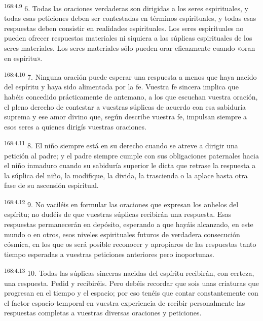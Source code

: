 \par 
\textsuperscript{168:4.9} 6. Todas las oraciones verdaderas son dirigidas a los seres espirituales, y todas esas peticiones deben ser contestadas en términos espirituales, y todas esas respuestas deben consistir en realidades espirituales. Los seres espirituales no pueden ofrecer respuestas materiales ni siquiera a las súplicas espirituales de los seres materiales. Los seres materiales sólo pueden orar eficazmente cuando «oran en espíritu».

\par 
\textsuperscript{168:4.10} 7. Ninguna oración puede esperar una respuesta a menos que haya nacido del espíritu y haya sido alimentada por la fe. Vuestra fe sincera implica que habéis concedido prácticamente de antemano, a los que escuchan vuestra oración, el pleno derecho de contestar a vuestras súplicas de acuerdo con esa sabiduría suprema y ese amor divino que, según describe vuestra fe, impulsan siempre a esos seres a quienes dirigís vuestras oraciones.

\par 
\textsuperscript{168:4.11} 8. El niño siempre está en su derecho cuando se atreve a dirigir una petición al padre; y el padre siempre cumple con sus obligaciones paternales hacia el niño inmaduro cuando su sabiduría superior le dicta que retrase la respuesta a la súplica del niño, la modifique, la divida, la trascienda o la aplace hasta otra fase de su ascensión espiritual.

\par 
\textsuperscript{168:4.12} 9. No vaciléis en formular las oraciones que expresan los anhelos del espíritu; no dudéis de que vuestras súplicas recibirán una respuesta. Esas respuestas permanecerán en depósito, esperando a que hayáis alcanzado, en este mundo o en otros, esos niveles espirituales futuros de verdadera consecución cósmica, en los que os será posible reconocer y apropiaros de las respuestas tanto tiempo esperadas a vuestras peticiones anteriores pero inoportunas.

\par 
\textsuperscript{168:4.13} 10. Todas las súplicas sinceras nacidas del espíritu recibirán, con certeza, una respuesta. Pedid y recibiréis. Pero debéis recordar que sois unas criaturas que progresan en el tiempo y el espacio; por eso tenéis que contar constantemente con el factor espacio-temporal en vuestra experiencia de recibir personalmente las respuestas completas a vuestras diversas oraciones y peticiones.

